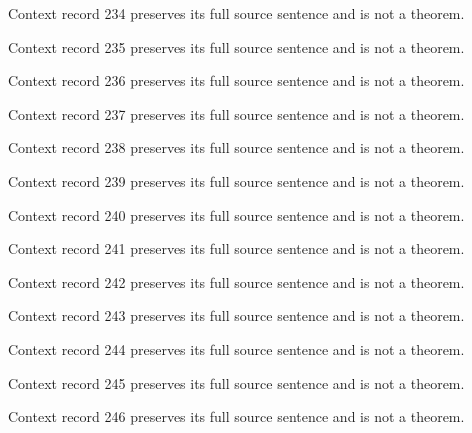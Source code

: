 \documentclass{article}
\begin{document}
\begin{remark}\label{train:context:234}Context record 234 preserves its full source sentence and is not a theorem.\end{remark}
\begin{remark}\label{train:context:235}Context record 235 preserves its full source sentence and is not a theorem.\end{remark}
\begin{remark}\label{train:context:236}Context record 236 preserves its full source sentence and is not a theorem.\end{remark}
\begin{remark}\label{train:context:237}Context record 237 preserves its full source sentence and is not a theorem.\end{remark}
\begin{remark}\label{train:context:238}Context record 238 preserves its full source sentence and is not a theorem.\end{remark}
\begin{remark}\label{train:context:239}Context record 239 preserves its full source sentence and is not a theorem.\end{remark}
\begin{remark}\label{train:context:240}Context record 240 preserves its full source sentence and is not a theorem.\end{remark}
\begin{remark}\label{train:context:241}Context record 241 preserves its full source sentence and is not a theorem.\end{remark}
\begin{remark}\label{train:context:242}Context record 242 preserves its full source sentence and is not a theorem.\end{remark}
\begin{remark}\label{train:context:243}Context record 243 preserves its full source sentence and is not a theorem.\end{remark}
\begin{remark}\label{train:context:244}Context record 244 preserves its full source sentence and is not a theorem.\end{remark}
\begin{remark}\label{train:context:245}Context record 245 preserves its full source sentence and is not a theorem.\end{remark}
\begin{remark}\label{train:context:246}Context record 246 preserves its full source sentence and is not a theorem.\end{remark}
\end{document}
